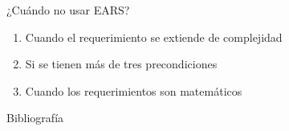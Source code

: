 \documentclass[
  24pt, %
  aspectratio=169, %
]{beamer}
\begin{document}

\begin{frame}{¿Cuándo no usar EARS?}
  \begin{enumerate}
  \item Cuando el requerimiento se extiende de complejidad
  \item Si se tienen más de tres precondiciones
  \item Cuando los requerimientos son matemáticos
  \end{enumerate}
\end{frame}




\begin{frame}{Bibliografía}
  \tiny
  
  
\end{frame}
\end{document}
